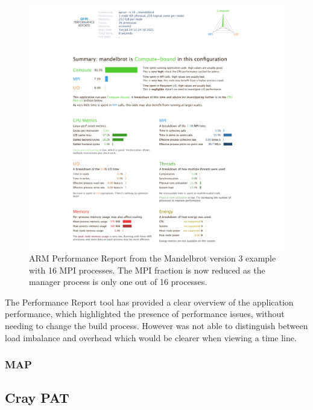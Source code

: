 \documentclass[a4paper,titlepage]{article}
\begin{document}
\begin{figure}[htbp]
\begin{center}
\includegraphics[scale=0.35]{figures/mandelbrot_v3_16procs_PerformanceReport}
\caption{ARM Performance Report from the Mandelbrot version 3 example with 16 MPI processes. The MPI fraction is now reduced as the manager process is only one out of 16 processes.}
\label{fig:perf-report_MB3_16procs}
\end{center}
\end{figure}

The Performance Report tool has provided a clear overview of the application performance, which highlighted the presence of performance issues, without needing to change the build process. However was not able to distinguish between load imbalance and overhead which would be clearer when viewing a time line.


\subsubsection{MAP}



\subsection{Cray PAT}
\end{document}
